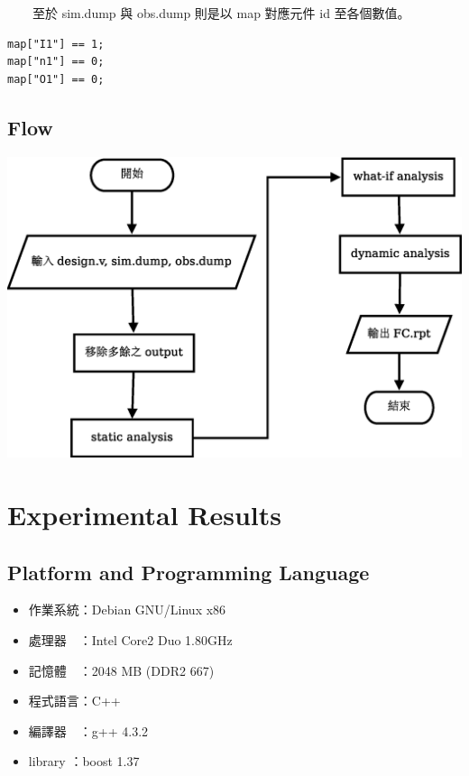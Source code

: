 \documentclass[12pt,a4paper]{article}
\begin{document}
\begin{CJK*}{UTF8}{song}
　　至於 sim.dump 與 obs.dump 則是以 map 對應元件 id 至各個數值。

\begin{verbatim}
map["I1"] == 1;
map["n1"] == 0;
map["O1"] == 0;
\end{verbatim}

\subsection{Flow}

\begin{center}
\includegraphics[scale=0.6]{imgs/03.eps}
\end{center}

\section{Experimental Results}

\subsection{Platform and Programming Language}

\begin{itemize}
\item 作業系統：Debian GNU/Linux x86
\item 處理器　：Intel Core2 Duo 1.80GHz
\item 記憶體　：2048 MB (DDR2 667)
\item 程式語言：C++
\item 編譯器　：g++ 4.3.2
\item library ：boost 1.37
\end{itemize}


\end{CJK*}
\end{document}
